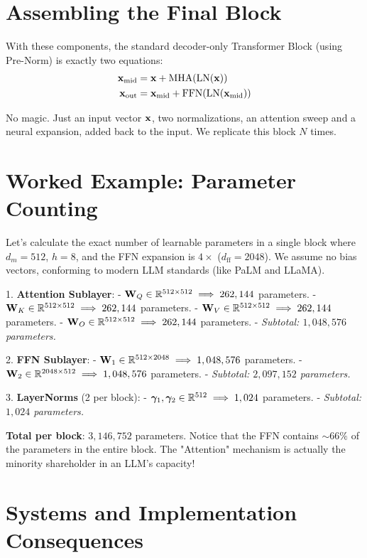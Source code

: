 \section{Assembling the Final Block}
With these components, the standard decoder-only Transformer Block (using Pre-Norm) is exactly two equations:
\begin{align}
\mathbf{x}_{\text{mid}} &= \mathbf{x} + \text{MHA}(\text{LN}(\mathbf{x})) \\
\mathbf{x}_{\text{out}} &= \mathbf{x}_{\text{mid}} + \text{FFN}(\text{LN}(\mathbf{x}_{\text{mid}}))
\end{align}

No magic. Just an input vector $\mathbf{x}$, two normalizations, an attention sweep and a neural expansion, added back to the input. We replicate this block $N$ times.

\section{Worked Example: Parameter Counting}
\label{ch:10:sec:example}

Let's calculate the exact number of learnable parameters in a single block where $d_m = 512$, $h=8$, and the FFN expansion is $4\times$ ($d_{\text{ff}} = 2048$). We assume no bias vectors, conforming to modern LLM standards (like PaLM and LLaMA).

1. \textbf{Attention Sublayer}:
   - $\mathbf{W}_Q \in \mathbb{R}^{512 \times 512} \implies 262,144$ parameters.
   - $\mathbf{W}_K \in \mathbb{R}^{512 \times 512} \implies 262,144$ parameters.
   - $\mathbf{W}_V \in \mathbb{R}^{512 \times 512} \implies 262,144$ parameters.
   - $\mathbf{W}_O \in \mathbb{R}^{512 \times 512} \implies 262,144$ parameters.
   - \emph{Subtotal: $1,048,576$ parameters.}

2. \textbf{FFN Sublayer}:
   - $\mathbf{W}_1 \in \mathbb{R}^{512 \times 2048} \implies 1,048,576$ parameters.
   - $\mathbf{W}_2 \in \mathbb{R}^{2048 \times 512} \implies 1,048,576$ parameters.
   - \emph{Subtotal: $2,097,152$ parameters.}

3. \textbf{LayerNorms} (2 per block):
   - $\boldsymbol{\gamma}_{1}, \boldsymbol{\gamma}_{2} \in \mathbb{R}^{512} \implies 1,024$ parameters.
   - \emph{Subtotal: $1,024$ parameters.}

\textbf{Total per block}: $3,146,752$ parameters. 
Notice that the FFN contains $\sim 66\%$ of the parameters in the entire block. The "Attention" mechanism is actually the minority shareholder in an LLM's capacity!

\section{Systems and Implementation Consequences}
\label{ch:10:sec:systems}

